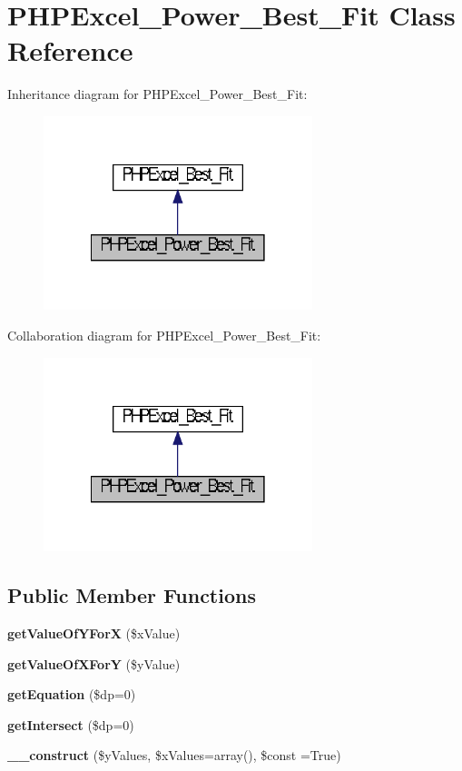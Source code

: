 \section{P\+H\+P\+Excel\+\_\+\+Power\+\_\+\+Best\+\_\+\+Fit Class Reference}
\label{class_p_h_p_excel___power___best___fit}


Inheritance diagram for P\+H\+P\+Excel\+\_\+\+Power\+\_\+\+Best\+\_\+\+Fit\+:\nopagebreak
\begin{figure}[H]
\begin{center}
\leavevmode
\includegraphics[width=222pt]{class_p_h_p_excel___power___best___fit__inherit__graph}
\end{center}
\end{figure}


Collaboration diagram for P\+H\+P\+Excel\+\_\+\+Power\+\_\+\+Best\+\_\+\+Fit\+:\nopagebreak
\begin{figure}[H]
\begin{center}
\leavevmode
\includegraphics[width=222pt]{class_p_h_p_excel___power___best___fit__coll__graph}
\end{center}
\end{figure}
\subsection*{Public Member Functions}
\begin{DoxyCompactItemize}
\item 
{\bf get\+Value\+Of\+Y\+For\+X} (\$x\+Value)
\item 
{\bf get\+Value\+Of\+X\+For\+Y} (\$y\+Value)
\item 
{\bf get\+Equation} (\$dp=0)
\item 
{\bf get\+Intersect} (\$dp=0)
\item 
{\bf \+\_\+\+\_\+construct} (\$y\+Values, \$x\+Values=array(), \$const =True)
\end{DoxyCompactItemize}
